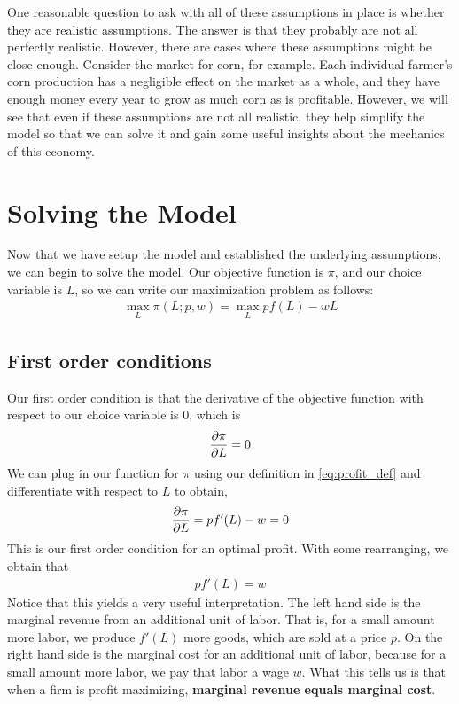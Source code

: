 One reasonable question to ask with all of these assumptions in place is whether they are realistic assumptions. The answer is that they probably are not all perfectly realistic. However, there are cases where these assumptions might be close enough. Consider the market for corn, for example. Each individual farmer's corn production has a negligible effect on the market as a whole, and they have enough money every year to grow as much corn as is profitable. However, we will see that even if these assumptions are not all realistic, they help simplify the model so that we can solve it and gain some useful insights about the mechanics of this economy. 

\section{Solving the Model} \label{sec:solving_model}
Now that we have setup the model and established the underlying assumptions, we can begin to solve the model. Our objective function is $\pi$, and our choice variable is $L$, so we can write our maximization problem as follows:
\begin{align}
    \max_{L} \pi(L; p, w) = \max_{L} p f(L) - w L
\end{align}

\subsection*{First order conditions}
Our first order condition is that the derivative of the objective function with respect to our choice variable is 0, which is
\begin{align}
    \frac{\partial \pi}{\partial L} = 0 \label{eq:profit_foc}
\end{align}
We can plug in our function for $\pi$ using our definition in \ref{eq:profit_def} and differentiate with respect to $L$ to obtain,
\begin{align}
    \frac{\partial \pi}{\partial L} = p f'(L) - w = 0
\end{align}
This is our first order condition for an optimal profit. With some rearranging, we obtain that
\begin{align}
    p f'(L) = w 
\end{align}
Notice that this yields a very useful interpretation. The left hand side is the marginal revenue from an additional unit of labor. That is, for a small amount more labor, we produce $f'(L)$ more goods, which are sold at a price $p$. On the right hand side is the marginal cost for an additional unit of labor, because for a small amount more labor, we pay that labor a wage $w$. What this tells us is that when a firm is profit maximizing, \textbf{marginal revenue equals marginal cost}. 

